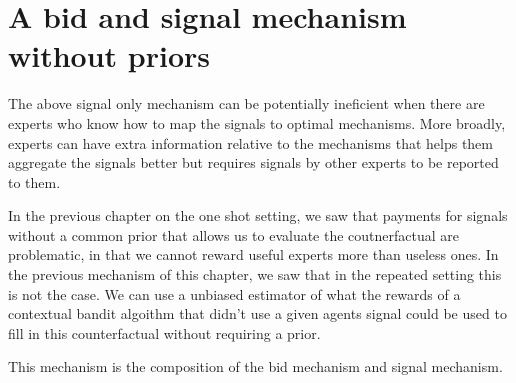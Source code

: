 
	




\section{A bid and signal mechanism without priors}



The above signal only mechanism can be potentially ineficient when there are experts who know how to map the signals to optimal mechanisms. More broadly, experts can have extra information relative to the mechanisms that helps them aggregate the signals better but requires signals by other experts to be reported to them. 

In the previous chapter on the one shot setting, we saw that payments for  signals without a common prior that allows us to evaluate the coutnerfactual are problematic, in that we cannot reward useful experts more than useless ones. In the previous mechanism of this chapter, we saw that in the repeated setting this is not the case. We can use a unbiased estimator of what the rewards of a contextual bandit algoithm that didn't use a given agents signal could be used to fill in this counterfactual without requiring a prior.

This mechanism is the composition of the bid mechanism and signal mechanism.


